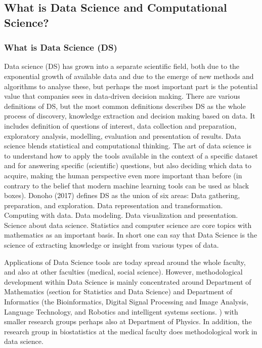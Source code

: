 \documentclass[a4paper,10pt]{article}
\begin{document}
\subsection{What is Data Science and Computational Science?}

\subsubsection*{What is Data Science (DS)}
Data science (DS) has grown into a separate scientific field, both due to the exponential growth of available data and due to the emerge of new methods and algorithms to analyse these, but perhaps the most important part is the potential value that companies sees in data-driven decision making. 
There are various definitions of DS, but the most common definitions describes DS as the whole process of discovery, knowledge extraction and decision making based on data. It includes definition of questions of interest, data collection and preparation, exploratory analysis, modelling, evaluation and presentation of results.  
Data science blends statistical and computational thinking. The art of data science is to understand how to apply the tools available in the context of a specific dataset and for answering specific (scientific) questions, but also deciding which data to acquire, making the human perspective even more important than before (in contrary to the belief that modern machine learning tools can be used as black boxes).
Donoho (2017) defines DS as the union of six areas:
Data gathering, preparation, and exploration.
Data representation and transformation.
Computing with data.
Data modeling.
Data visualization and presentation.
Science about data science.
Statistics and computer science are core topics with mathematics as an important basis. In short one can say that Data Science is the science of extracting knowledge or insight from various types of data. 




Applications of Data Science tools are today spread around the whole faculty, and also at other faculties (medical, social science). However, methodological development within Data Science is mainly concentrated around Department of Mathematics (section for Statistics and Data Science) and Department of Informatics (the Bioinformatics,   Digital Signal Processing and Image Analysis, Language Technology, and Robotics and intelligent systems sections. ) with smaller research groups perhaps also at Department of Physics. In addition, the research group in biostatistics at the medical faculty does methodological work in data science.
\end{document}
